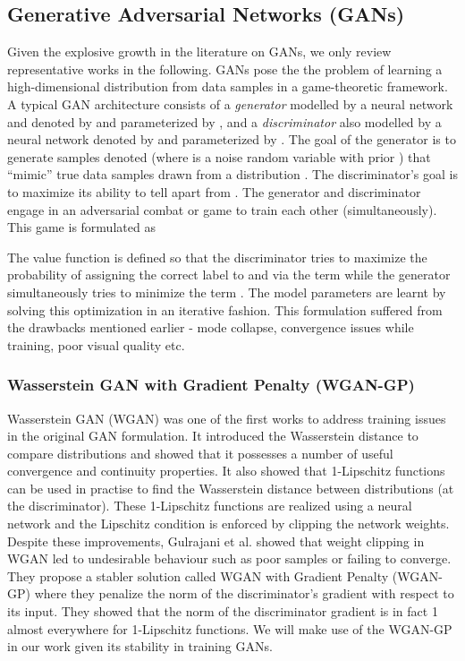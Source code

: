 \documentclass{article}
\begin{document}
\subsection{Generative Adversarial Networks (GANs)}
\label{ssec:gans}
Given the explosive growth in the literature on GANs, we only review representative works in the following. GANs \cite{goodfellow2014generative} pose the the problem of learning a high-dimensional distribution from data samples in a game-theoretic framework. A typical GAN architecture consists of a {\em{generator}} modelled by a neural network and denoted by  and parameterized by , and a {\em{discriminator}} also modelled by a neural network denoted by  and parameterized by . The goal of the generator is to generate samples denoted  (where  is a noise random variable with prior ) that ``mimic'' true data samples  drawn from a distribution . The discriminator's goal is to maximize its ability to tell  apart from . The generator and discriminator engage in an adversarial combat or game to train each other (simultaneously). This game is formulated as

The value function  is defined so that the discriminator tries to maximize the probability of assigning the correct label to  and  via the term  while the generator simultaneously tries to minimize the term . The model parameters  are learnt by solving this optimization in an iterative fashion. This formulation suffered from the drawbacks mentioned earlier - mode collapse, convergence issues while training, poor visual quality etc.

\subsubsection{Wasserstein GAN with Gradient Penalty (WGAN-GP)}
\label{sssec:wgan_gp}
Wasserstein GAN (WGAN) \cite{arjovsky2017wasserstein} was one of the first works to address training issues in the original GAN formulation. It introduced the Wasserstein distance to compare distributions and showed that it possesses a number of useful convergence and continuity properties. It also showed that 1-Lipschitz functions can be used in practise to find the Wasserstein distance between distributions (at the discriminator). These 1-Lipschitz functions are realized using a neural network and the Lipschitz condition is enforced by clipping the network weights. Despite these improvements, Gulrajani et al. \cite{gulrajani2017improved} showed that weight clipping in WGAN led to undesirable behaviour such as poor samples or failing to converge. They propose a stabler solution called 
WGAN with Gradient Penalty (WGAN-GP) where they penalize the norm of the discriminator's gradient with respect to its input. They showed that the norm of the discriminator gradient is in fact 1 almost everywhere for 1-Lipschitz functions. We will make use of the WGAN-GP in our work given its stability in training GANs.
\end{document}
